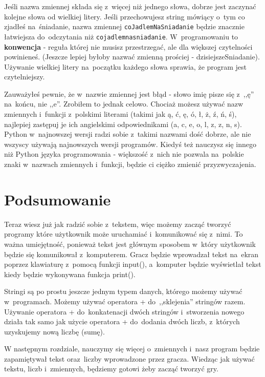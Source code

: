 \documentclass{book}
\begin{document}
Jeśli nazwa zmiennej składa się z~więcej niż jednego słowa, dobrze jest zaczynać kolejne słowa od wielkiej litery. Jeśli przechowujesz string mówiący o~tym co zjadłeś na~śniadanie, nazwa zmiennej \lstinline{coJadlemNaSniadanie} będzie znacznie łatwiejsza do~odczytania niż \lstinline{cojadlemnasniadanie}. W~programowaniu to {\bf konwencja} - reguła której nie musisz przestrzegać, ale dla większej czytelności powinieneś. (Jeszcze lepiej byłoby nazwać zmienną prościej - dzisiejszeSniadanie). Używanie wielkiej litery na~początku każdego słowa sprawia, że program jest czytelniejszy.

Zauważyłeś pewnie, że w~nazwie zmiennej jest błąd - słowo imię pisze się z~,,ę'' na~końcu, nie ,,e''. Zrobiłem to jednak celowo. Chociaż możesz używać nazw zmiennych i~funkcji z~polskimi literami (takimi jak ą, ć, ę, ó, ł, ż, ź, ń, ś), najlepiej zastępuj je ich angielskimi odpowiednikami (a, c, e, o, l, z, z, n, s). Python w~najnowszej wersji radzi sobie z~takimi nazwami dość dobrze, ale nie wszyscy używają najnowszych wersji programów. Kiedyś też nauczysz się innego niż Python języka programowania - większość z~nich nie pozwala na~polskie znaki w~nazwach zmiennych i~funkcji, będzie ci ciężko zmienić przyzwyczajenia.

\section{Podsumowanie}

Teraz wiesz już jak radzić sobie z~tekstem, więc możemy zacząć tworzyć programy które użytkownik może uruchamiać i~komunikować się z~nimi. To ważna umiejętność, ponieważ tekst jest głównym sposobem w~który użytkownik będzie się komunikował z~komputerem. Gracz będzie wprowadzał tekst na~ekran poprzez klawiaturę z~pomocą funkcji input(), a~komputer będzie wyświetlał tekst kiedy będzie wykonywana funkcja print().

Stringi są po prostu jeszcze jednym typem danych, którego możemy używać w~programach. Możemy używać operatora + do~,,sklejenia'' stringów razem. Używanie operatora + do~konkatenacji dwóch stringów i~stworzenia nowego działa tak samo jak użycie operatora + do~dodania dwóch liczb, z~których uzyskujemy nową liczbę (sumę).

W następnym rozdziale, nauczymy się więcej o~zmiennych i~nasz program będzie zapamiętywał tekst oraz~liczby wprowadzone przez gracza. Wiedząc jak używać tekstu, liczb i~zmiennych, będziemy gotowi żeby zacząć tworzyć gry.
\end{document}
